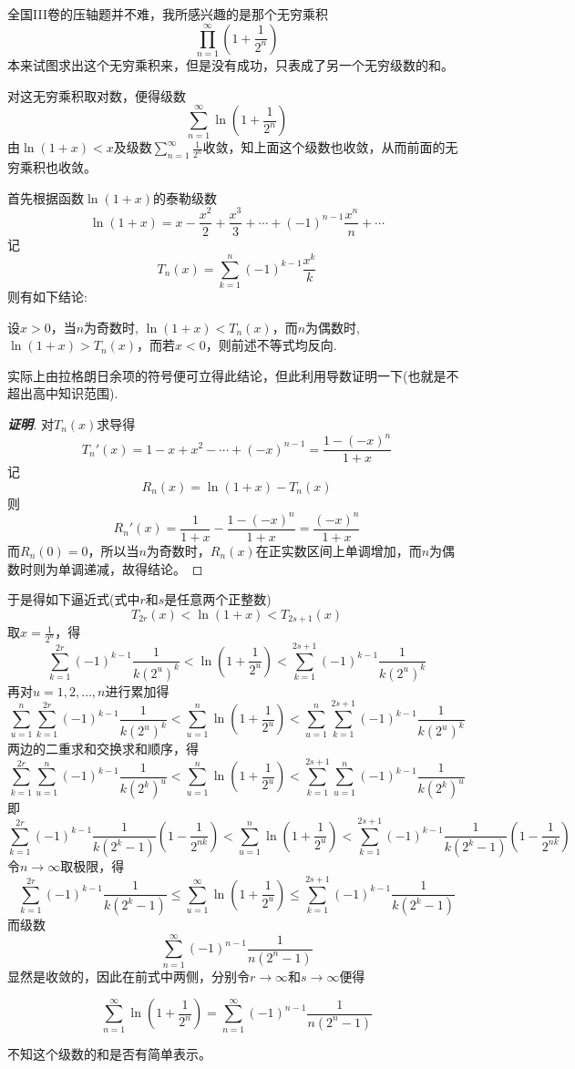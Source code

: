 \documentclass{ctexart}
\begin{document}
全国III卷的压轴题并不难，我所感兴趣的是那个无穷乘积
\[ \prod_{n=1}^{\infty}\left( 1+\frac{1}{2^n} \right) \]
本来试图求出这个无穷乘积来，但是没有成功，只表成了另一个无穷级数的和。

对这无穷乘积取对数，便得级数
\[ \sum_{n=1}^{\infty} \ln{ \left( 1+\frac{1}{2^n} \right) } \]
由$\ln(1+x)<x$及级数$\sum_{n=1}^{\infty} \frac{1}{2^n}$收敛，知上面这个级数也收敛，从而前面的无穷乘积也收敛。

首先根据函数$\ln{(1+x)}$的泰勒级数
\[ \ln{(1+x)} = x-\frac{x^2}{2}+\frac{x^3}{3}+\cdots + (-1)^{n-1} \frac{x^n}{n}  + \cdots \]
记
\[ T_n(x) = \sum_{k=1}^n (-1)^{k-1}\frac{x^k}{k} \]
则有如下结论:
\begin{statement}
  设$x>0$，当$n$为奇数时, $\ln{(1+x)} < T_n(x)$，而$n$为偶数时, $\ln{(1+x)}>T_n(x)$，而若$x<0$，则前述不等式均反向.
\end{statement}
实际上由拉格朗日余项的符号便可立得此结论，但此利用导数证明一下(也就是不超出高中知识范围).
\begin{proof}[\textbf{证明}]
  对$T_n(x)$求导得
  \[ T_n'(x) = 1-x+x^2-\cdots + (-x)^{n-1} = \frac{1-(-x)^n}{1+x} \]
  记
  \[ R_n(x) = \ln{(1+x)}-T_n(x) \]
  则
  \[ R_n'(x) = \frac{1}{1+x} - \frac{1-(-x)^n}{1+x} = \frac{(-x)^n}{1+x} \]
  而$R_n(0)=0$，所以当$n$为奇数时，$R_n(x)$在正实数区间上单调增加，而$n$为偶数时则为单调递减，故得结论。
\end{proof}

于是得如下逼近式(式中$r$和$s$是任意两个正整数)
\[ T_{2r}(x) < \ln{(1+x)} < T_{2s+1}(x) \]
取$x=\frac{1}{2^u}$，得
\[ \sum_{k=1}^{2r} (-1)^{k-1} \frac{1}{k(2^u)^k} < \ln{\left( 1+\frac{1}{2^u} \right) < \sum_{k=1}^{2s+1} (-1)^{k-1} \frac{1}{k(2^u)^k}} \]
再对$u=1,2,\ldots,n$进行累加得
\[ \sum_{u=1}^n \sum_{k=1}^{2r} (-1)^{k-1} \frac{1}{k(2^u)^k} < \sum_{u=1}^n \ln{\left( 1+\frac{1}{2^u} \right) < \sum_{u=1}^{n} \sum_{k=1}^{2s+1} (-1)^{k-1} \frac{1}{k(2^u)^k}} \]
两边的二重求和交换求和顺序，得
\[  \sum_{k=1}^{2r} \sum_{u=1}^n (-1)^{k-1} \frac{1}{k(2^k)^u} < \sum_{u=1}^n \ln{\left( 1+\frac{1}{2^u} \right) <  \sum_{k=1}^{2s+1} \sum_{u=1}^{n}(-1)^{k-1} \frac{1}{k(2^k)^u}} \]
即
\[ \sum_{k=1}^{2r} (-1)^{k-1} \frac{1}{k(2^k-1)} \left( 1-\frac{1}{2^{nk}} \right) < \sum_{u=1}^n \ln{\left( 1+\frac{1}{2^u} \right)} < \sum_{k=1}^{2s+1} (-1)^{k-1} \frac{1}{k(2^k-1)} \left( 1-\frac{1}{2^{nk}} \right)\]
令$n\to\infty$取极限，得
\[ \sum_{k=1}^{2r} (-1)^{k-1} \frac{1}{k(2^k-1)} \leqslant \sum_{u=1}^{\infty} \ln{\left( 1+\frac{1}{2^u} \right)} \leqslant \sum_{k=1}^{2s+1} (-1)^{k-1} \frac{1}{k(2^k-1)} \]
而级数
\[ \sum_{n=1}^{\infty} (-1)^{n-1} \frac{1}{n(2^n-1)} \]
显然是收敛的，因此在前式中两侧，分别令$r \to \infty$和$s \to \infty$便得
\begin{statement}
\[ \sum_{n=1}^{\infty} \ln{\left( 1+\frac{1}{2^n} \right)} = \sum_{n=1}^{\infty} (-1)^{n-1} \frac{1}{n(2^n-1)} \]
\end{statement}
不知这个级数的和是否有简单表示。
\end{document}
